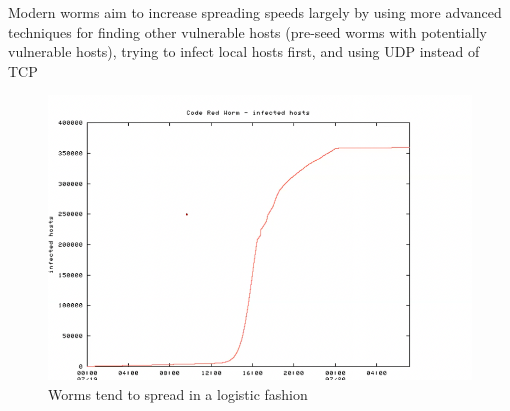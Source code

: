 \documentclass[../notes.tex]{subfiles}
\begin{document}
Modern worms aim to increase spreading speeds largely by using more advanced techniques for finding other vulnerable hosts (pre-seed worms with potentially vulnerable hosts), trying to infect local hosts first, and using UDP instead of TCP



\begin{figure}[H]
    \centering
    \includegraphics[width=0.8\linewidth]{img/image_2023-04-03-18-57-31.png}
    \caption{Worms tend to spread in a logistic fashion}
\end{figure}
\end{document}
